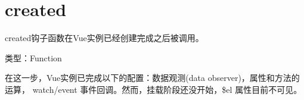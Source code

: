 \begin{lstlisting}[language=JavaScript]

\end{lstlisting}




\begin{lstlisting}[language=JavaScript]

\end{lstlisting}




\begin{lstlisting}[language=JavaScript]

\end{lstlisting}




\begin{lstlisting}[language=JavaScript]

\end{lstlisting}




\begin{lstlisting}[language=JavaScript]

\end{lstlisting}




\section{created}



created钩子函数在Vue实例已经创建完成之后被调用。


\begin{compactitem}
\item 类型：Function
\end{compactitem}

在这一步，Vue实例已完成以下的配置：数据观测(data observer)，属性和方法的运算， watch/event 事件回调。然而，挂载阶段还没开始，\$el 属性目前不可见。



\begin{lstlisting}[language=JavaScript]

\end{lstlisting}




\begin{lstlisting}[language=JavaScript]

\end{lstlisting}




